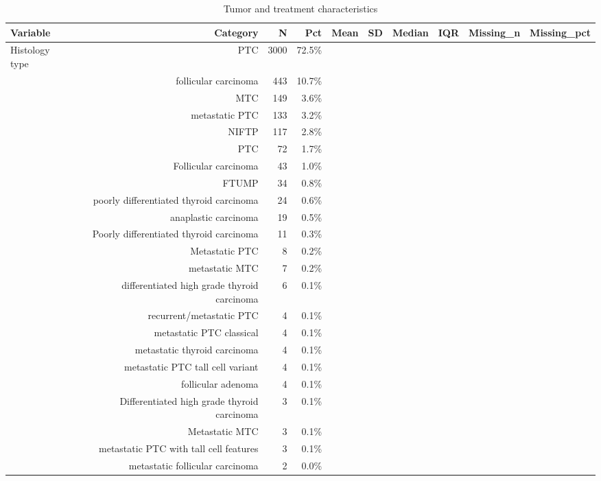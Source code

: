 \begin{table}[htbp]
\centering
\caption{Tumor and treatment characteristics}
\label{tab:tumor_treatment}
\begin{tabular}{lrrrrrrrrr}
\toprule
Variable & Category & N & Pct & Mean & SD & Median & IQR & Missing\_n & Missing\_pct \\
\midrule
Histology type & PTC & 3000 & 72.5\% &  &  &  &  &  &  \\
 & follicular carcinoma & 443 & 10.7\% &  &  &  &  &  &  \\
 & MTC & 149 & 3.6\% &  &  &  &  &  &  \\
 & metastatic PTC & 133 & 3.2\% &  &  &  &  &  &  \\
 & NIFTP & 117 & 2.8\% &  &  &  &  &  &  \\
 & PTC  & 72 & 1.7\% &  &  &  &  &  &  \\
 & Follicular carcinoma & 43 & 1.0\% &  &  &  &  &  &  \\
 & FTUMP & 34 & 0.8\% &  &  &  &  &  &  \\
 & poorly differentiated thyroid carcinoma & 24 & 0.6\% &  &  &  &  &  &  \\
 & anaplastic carcinoma & 19 & 0.5\% &  &  &  &  &  &  \\
 & Poorly differentiated thyroid carcinoma & 11 & 0.3\% &  &  &  &  &  &  \\
 & Metastatic PTC & 8 & 0.2\% &  &  &  &  &  &  \\
 & metastatic MTC & 7 & 0.2\% &  &  &  &  &  &  \\
 & differentiated high grade thyroid carcinoma & 6 & 0.1\% &  &  &  &  &  &  \\
 & recurrent/metastatic PTC & 4 & 0.1\% &  &  &  &  &  &  \\
 & metastatic PTC classical & 4 & 0.1\% &  &  &  &  &  &  \\
 & metastatic thyroid carcinoma & 4 & 0.1\% &  &  &  &  &  &  \\
 & metastatic PTC tall cell variant & 4 & 0.1\% &  &  &  &  &  &  \\
 & follicular adenoma & 4 & 0.1\% &  &  &  &  &  &  \\
 & Differentiated high grade thyroid carcinoma & 3 & 0.1\% &  &  &  &  &  &  \\
 & Metastatic MTC & 3 & 0.1\% &  &  &  &  &  &  \\
 & metastatic PTC with tall cell features & 3 & 0.1\% &  &  &  &  &  &  \\
 & metastatic follicular carcinoma & 2 & 0.0\% &  &  &  &  &  &  \\

\end{tabular}
\end{table}
